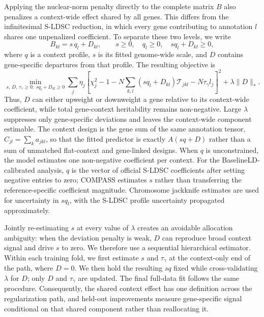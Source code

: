 \documentclass[11pt]{article}
\begin{document}
Applying the nuclear-norm penalty directly to the complete matrix $B$ also penalizes a context-wide effect shared by all genes. This differs from the infinitesimal S-LDSC reduction, in which every gene contributing to annotation $l$ shares one unpenalized coefficient. To separate these two levels, we write
\begin{equation}
    B_{kl} = s\,q_l + D_{kl}, \qquad s\ge 0,\quad q_l\ge 0,\quad s q_l+D_{kl}\ge 0,
    \label{eq:hierarchical-B}
\end{equation}
where $q$ is a context profile, $s$ is its fitted genome-wide scale, and $D$ contains gene-specific departures from that profile. The resulting objective is
\begin{equation}
    \min_{s,\,D,\,\tau_\gamma\ge0:\;s q_l+D_{kl}\ge0}
    \sum_j \eta_j\left[
      \chi_j^2-1-N\sum_{k,l}(s q_l+D_{kl})\mathcal{T}_{jkl}
      -N\tau_\gamma l_j
    \right]^2 + \lambda\lVert D\rVert_*.
    \label{eq:hierarchical-objective}
\end{equation}
Thus, $D$ can either upweight or downweight a gene relative to its context-wide coefficient, while total gene-context heritability remains non-negative. Large $\lambda$ suppresses only gene-specific deviations and leaves the context-wide component estimable. The context design is the gene sum of the same annotation tensor, $C_{jl}=\sum_k a_{jkl}$, so that the fitted predictor is exactly $A(sq+D)$ rather than a sum of unmatched flat-context and gene-linked designs. When $q$ is unconstrained, the model estimates one non-negative coefficient per context. For the BaselineLD-calibrated analysis, $q$ is the vector of official S-LDSC coefficients after setting negative entries to zero; COMPASS estimates $s$ rather than transferring the reference-specific coefficient magnitude. Chromosome jackknife estimates are used for uncertainty in $s q_l$, with the S-LDSC profile uncertainty propagated approximately.

Jointly re-estimating $s$ at every value of $\lambda$ creates an avoidable allocation ambiguity: when the deviation penalty is weak, $D$ can reproduce broad context signal and drive $s$ to zero. We therefore use a sequential hierarchical estimator. Within each training fold, we first estimate $s$ and $\tau_\gamma$ at the context-only end of the path, where $D=0$. We then hold the resulting $s q$ fixed while cross-validating $\lambda$ for $D$; only $D$ and $\tau_\gamma$ are updated. The final full-data fit follows the same procedure. Consequently, the shared context effect has one definition across the regularization path, and held-out improvements measure gene-specific signal conditional on that shared component rather than reallocating it.
\end{document}
